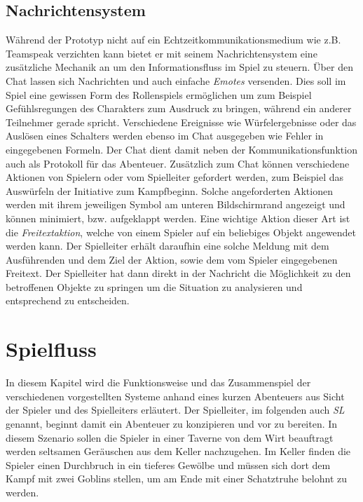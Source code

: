 \subsection{Nachrichtensystem}
\label{sec:Nachrichtensystem}
Während der Prototyp nicht auf ein Echtzeitkommunikationsmedium wie z.B. Teamspeak verzichten kann bietet er mit seinem Nachrichtensystem eine zusätzliche Mechanik an um den Informationsfluss im Spiel zu steuern. 
Über den Chat lassen sich Nachrichten und auch einfache \emph{Emotes} versenden. Dies soll im Spiel eine gewissen Form des Rollenspiels ermöglichen um zum Beispiel Gefühlsregungen des Charakters zum Ausdruck zu bringen, während ein anderer Teilnehmer gerade spricht. Verschiedene Ereignisse wie Würfelergebnisse oder das Auslösen eines Schalters werden ebenso im Chat ausgegeben wie Fehler in eingegebenen Formeln. Der Chat dient damit neben der Kommunikationsfunktion auch als Protokoll für das Abenteuer.\newline
Zusätzlich zum Chat können verschiedene Aktionen von Spielern oder vom Spielleiter gefordert werden, zum Beispiel das Auswürfeln der Initiative zum Kampfbeginn. Solche angeforderten Aktionen werden mit ihrem jeweiligen Symbol am unteren Bildschirmrand angezeigt und können minimiert, bzw. aufgeklappt werden.\newline
Eine wichtige Aktion dieser Art ist die \emph{Freitextaktion}, welche von einem Spieler auf ein beliebiges Objekt angewendet werden kann. Der Spielleiter erhält daraufhin eine solche Meldung mit dem Ausführenden und dem Ziel der Aktion, sowie dem vom Spieler eingegebenen Freitext. Der Spielleiter hat dann direkt in der Nachricht die Möglichkeit zu den betroffenen Objekte zu springen um die Situation zu analysieren und entsprechend zu entscheiden.


\section{Spielfluss}
\label{sec:Spielfluss}

In diesem Kapitel wird die Funktionsweise und das Zusammenspiel der verschiedenen vorgestellten Systeme anhand eines kurzen Abenteuers aus Sicht der Spieler und des Spielleiters erläutert.\newline
Der Spielleiter, im folgenden auch \emph{SL} genannt, beginnt damit ein Abenteuer zu konzipieren und vor zu bereiten. In diesem Szenario sollen die Spieler in einer Taverne von dem Wirt beauftragt werden seltsamen Geräuschen aus dem Keller nachzugehen. Im Keller finden die Spieler einen Durchbruch in ein tieferes Gewölbe und müssen sich dort dem Kampf mit zwei Goblins stellen, um am Ende mit einer Schatztruhe belohnt zu werden.\newline

